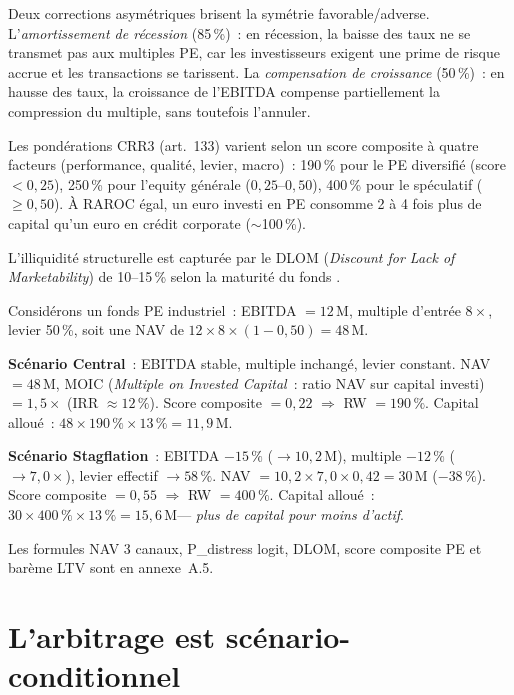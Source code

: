 \documentclass[10pt, a4paper, oneside]{report}
\theoremstyle{definition}
\begin{document}
Deux corrections asymétriques brisent la symétrie favorable/adverse. L'\emph{amortissement de récession} (85\,\%)~: en récession, la baisse des taux ne se transmet pas aux multiples PE, car les investisseurs exigent une prime de risque accrue et les transactions se tarissent. La \emph{compensation de croissance} (50\,\%)~: en hausse des taux, la croissance de l'EBITDA compense partiellement la compression du multiple, sans toutefois l'annuler.

Les pondérations CRR3 (art.~133) varient selon un score composite à quatre facteurs (performance, qualité, levier, macro)~: 190\,\% pour le PE diversifié (score $< 0{,}25$), 250\,\% pour l'equity générale ($0{,}25$--$0{,}50$), 400\,\% pour le spéculatif ($\geq 0{,}50$). À RAROC égal, un euro investi en PE consomme 2 à 4 fois plus de capital qu'un euro en crédit corporate ($\sim$100\,\%).

L'illiquidité structurelle est capturée par le DLOM (\emph{Discount for Lack of Marketability}) de 10--15\,\% selon la maturité du fonds \citep{jefferies_lazard2023}.

\begin{tcolorbox}[colback=bleutitre!3, colframe=bleutitre!50, title=\small\textbf{Exemple~: fonds PE industriel}]
\small
Considérons un fonds PE industriel~: EBITDA $= 12$\,M\texteuro, multiple d'entrée $8\times$, levier 50\,\%, soit une NAV de $12 \times 8 \times (1 - 0{,}50) = 48$\,M\texteuro.

\medskip
\textbf{Scénario Central}~: EBITDA stable, multiple inchangé, levier constant. NAV $= 48$\,M\texteuro, MOIC (\emph{Multiple on Invested Capital}~: ratio NAV sur capital investi) $= 1{,}5\times$ (IRR $\approx 12\,\%$). Score composite $= 0{,}22$ $\Rightarrow$ RW $= 190\,\%$. Capital alloué~: $48 \times 190\,\% \times 13\,\% = 11{,}9$\,M\texteuro.

\medskip
\textbf{Scénario Stagflation}~: EBITDA $-15\,\%$ ($\to 10{,}2$\,M\texteuro), multiple $-12\,\%$ ($\to 7{,}0\times$), levier effectif $\to 58\,\%$. NAV $= 10{,}2 \times 7{,}0 \times 0{,}42 = 30$\,M\texteuro{} ($-38\,\%$). Score composite $= 0{,}55$ $\Rightarrow$ RW $= 400\,\%$. Capital alloué~: $30 \times 400\,\% \times 13\,\% = 15{,}6$\,M\texteuro --- \textit{plus de capital pour moins d'actif}.
\end{tcolorbox}

Les formules NAV 3 canaux, P\_distress logit, DLOM, score composite PE et barème LTV sont en annexe~A.5.


\section{L'arbitrage est scénario-conditionnel}
\label{sec:ch2:arbitrage}
\end{document}
